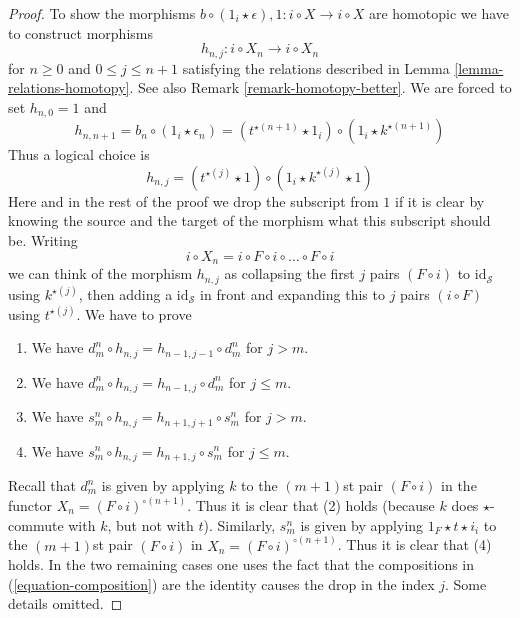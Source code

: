 \begin{proof}
\medskip\noindent
To show the morphisms
$b \circ (1_i \star \epsilon), 1 : i \circ X \to i \circ X$
are homotopic we have to construct morphisms
$$
h_{n, j} : i \circ X_n \to i \circ X_n
$$
for $n \geq 0$ and $0 \leq j \leq n + 1$
satisfying the relations described in Lemma \ref{lemma-relations-homotopy}.
See also Remark \ref{remark-homotopy-better}.
We are forced to set $h_{n, 0} = 1$ and
$$
h_{n , n + 1} = b_n \circ (1_i \star \epsilon_n) =
(t^{\star (n + 1)} \star 1_i) \circ (1_i \star k^{\star (n + 1)})
$$
Thus a logical choice is
$$
h_{n , j} =
(t^{\star (j)} \star 1) \circ (1_i \star k^{\star (j)} \star 1)
$$
Here and in the rest of the proof we drop the subscript from $1$
if it is clear by knowing the source and the target of the morphism
what this subscript should be. Writing
$$
i \circ X_n = i \circ F \circ i \circ \ldots \circ F \circ i
$$
we can think of the morphism $h_{n, j}$ as collapsing the first
$j$ pairs $(F \circ i)$ to $\text{id}_\mathcal{S}$ using $k^{\star (j)}$,
then adding a $\text{id}_\mathcal{S}$ in front and expanding this
to $j$ pairs $(i \circ F)$ using $t^{\star (j)}$. We have to prove
\begin{enumerate}
\item We have $d^n_m \circ h_{n, j} = h_{n - 1, j - 1} \circ d^n_m$
for $j > m$.
\item We have $d^n_m \circ h_{n, j} = h_{n - 1, j} \circ d^n_m$
for $j \leq m$.
\item We have $s^n_m \circ h_{n, j} = h_{n + 1, j + 1} \circ s^n_m$
for $j > m$.
\item We have $s^n_m \circ h_{n, j} = h_{n + 1, j} \circ s^n_m$
for $j \leq m$.
\end{enumerate}
Recall that $d^n_m$ is given by applying $k$ to the $(m + 1)$st pair
$(F \circ i)$ in the functor $X_n = (F \circ i)^{\circ (n + 1)}$. Thus
it is clear that (2) holds (because $k$ does $\star$-commute with $k$, but
not with $t$). Similarly, $s^n_m$ is given by applying
$1_F \star t \star i_i$ to the $(m + 1)$st pair $(F \circ i)$ in
$X_n = (F \circ i)^{\circ (n + 1)}$. Thus it is clear that (4) holds.
In the two remaining cases one uses the fact that the compositions
in (\ref{equation-composition}) are the identity causes the drop
in the index $j$. Some details omitted.


\end{proof}
